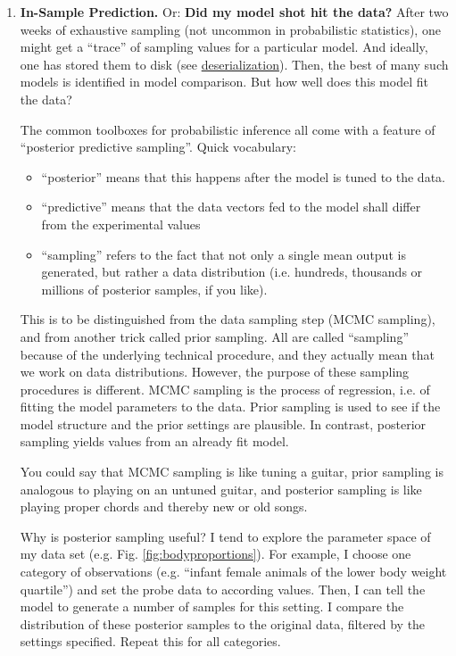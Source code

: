 \begin{enumerate}
\item \textbf{In-Sample Prediction.}
\label{sec:org369b808}
Or: \textbf{Did my model shot hit the data?}
After two weeks of exhaustive sampling (not uncommon in probabilistic statistics), one might get a ``trace'' of sampling values for a particular model.
And ideally, one has stored them to disk (see \hyperref[workflow:deserialization]{deserialization}).
Then, the best of many such models is identified in model comparison.
But how well does this model fit the data?

The common toolboxes for probabilistic inference all come with a feature of ``posterior predictive sampling''.
Quick vocabulary:
\begin{itemize}
\item ``posterior'' means that this happens after the model is tuned to the data.
\item ``predictive'' means that the data vectors fed to the model shall differ from the experimental values
\item ``sampling'' refers to the fact that not only a single mean output is generated, but rather a data distribution (i.e. hundreds, thousands or millions of posterior samples, if you like).
\end{itemize}

This is to be distinguished from the data sampling step (MCMC sampling), and from another trick called prior sampling.
All are called ``sampling'' because of the underlying technical procedure, and they actually mean that we work on data distributions.
However, the purpose of these sampling procedures is different.
MCMC sampling is the process of regression, i.e. of fitting the model parameters to the data.
Prior sampling is used to see if the model structure and the prior settings are plausible.
In contrast, posterior sampling yields values from an already fit model.

You could say that MCMC sampling is like tuning a guitar, prior sampling is analogous to playing on an untuned guitar, and posterior sampling is like playing proper chords and thereby new or old songs.


Why is posterior sampling useful?
I tend to explore the parameter space of my data set (e.g. Fig. \ref{fig:bodyproportions}).
For example, I choose one category of observations (e.g. ``infant female animals of the lower body weight quartile'') and set the probe data to according values.
Then, I can tell the model to generate a number of samples for this setting.
I compare the distribution of these posterior samples to the original data, filtered by the settings specified.
Repeat this for all categories.


\end{enumerate}
